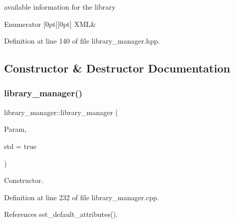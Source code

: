 available information for the library 

\begin{DoxyEnumFields}{Enumerator}
[0pt][0pt]{}\mbox{\label{classlibrary__manager_a5914a62c60d05c22f2547de9d8ef20dea6a31f2ebb20dd6acab09c1d34dc2e6c4}} 
X\+ML&\\
\hline

\end{DoxyEnumFields}


Definition at line 140 of file library\+\_\+manager.\+hpp.



\subsection{Constructor \& Destructor Documentation}
\mbox{\label{classlibrary__manager_af71a5b63e8589cc3e9d81e2748f571b5}} 
\subsubsection{\texorpdfstring{library\+\_\+manager()}{library\_manager()}\hspace{0.1cm}{\footnotesize\ttfamily [1/2]}}
{\footnotesize\ttfamily library\+\_\+manager\+::library\+\_\+manager (\begin{DoxyParamCaption}\item[{\hyperlink{Parameter_8hpp_a37841774a6fcb479b597fdf8955eb4ea}{Parameter\+Const\+Ref}}]{Param,  }\item[{bool}]{std = {\ttfamily true} }\end{DoxyParamCaption})}



Constructor. 



Definition at line 232 of file library\+\_\+manager.\+cpp.



References set\+\_\+default\+\_\+attributes().

